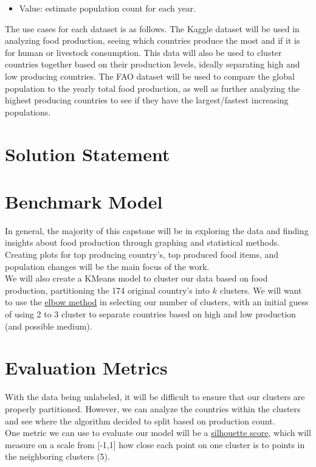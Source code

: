 \documentclass[12pt, a4paper]{article}
\begin{document}
\begin{spacing}{1.1}
\begin{itemize}
		\item Value: estimate population count for each year.
	\end{itemize}\vspace*{2mm}
	The use cases for each dataset is as follows. The Kaggle dataset will be used in analyzing food production, seeing which countries produce the most and if it is for human or livestock consumption. This data will also be used to cluster countries together based on their production levels, ideally separating high and low producing countries. The FAO dataset will be used to compare the global population to the yearly total food production, as well as further analyzing the highest producing countries to see if they have the largest/fastest increasing populations. \newpage
	
	
	\section{Solution Statement}
	
	
	
	
	\section{Benchmark Model}
	In general, the majority of this capstone will be in exploring the data and finding insights about food production through graphing and statistical methods. Creating plots for top producing country's, top produced food items, and population changes will be the main focus of the work. \vspace*{2mm}\\	
	We will also create a KMeans model to cluster our data based on food production, partitioning the 174 original country's into $k$ clusters. We will want to use the \href{https://www.scikit-yb.org/en/latest/api/cluster/elbow.html}{elbow method} in selecting our number of clusters, with an initial guess of using 2 to 3 cluster to separate countries based on high and low production (and possible medium). 
	
	
	
	\section{Evaluation Metrics}
	With the data being unlabeled, it will be difficult to ensure that our clusters are properly partitioned. However, we can analyze the countries within the clusters and see where the algorithm decided to split based on production count. \vspace*{2mm}\\
	One metric we can use to evaluate our model will be a \href{https://scikit-learn.org/stable/auto_examples/cluster/plot_kmeans_silhouette_analysis.html}{silhouette score}, which will measure on a scale from [-1,1] how close each point on one cluster is to points in the neighboring clusters (5).
	

\end{spacing}
\end{document}
